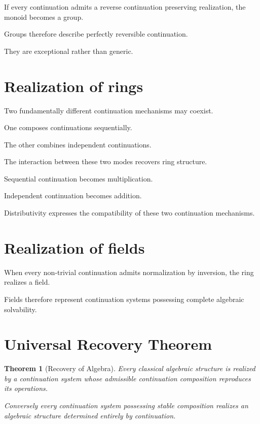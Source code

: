 \documentclass[13pt,openany]{book}
\theoremstyle{plain}
\newtheorem{theorem}{Theorem}[chapter]
\theoremstyle{definition}
\begin{document}
If every continuation admits a reverse continuation preserving realization, the monoid becomes a group.

Groups therefore describe perfectly reversible continuation.

They are exceptional rather than generic.

\section{Realization of rings}

Two fundamentally different continuation mechanisms may coexist.

One composes continuations sequentially.

The other combines independent continuations.

The interaction between these two modes recovers ring structure.

Sequential continuation becomes multiplication.

Independent continuation becomes addition.

Distributivity expresses the compatibility of these two continuation mechanisms.

\section{Realization of fields}

When every non-trivial continuation admits normalization by inversion, the ring realizes a field.

Fields therefore represent continuation systems possessing complete algebraic solvability.

\section{Universal Recovery Theorem}

\begin{theorem}[Recovery of Algebra]

Every classical algebraic structure is realized by a continuation system whose admissible continuation composition reproduces its operations.

Conversely every continuation system possessing stable composition realizes an algebraic structure determined entirely by continuation.

\end{theorem}
\end{document}
